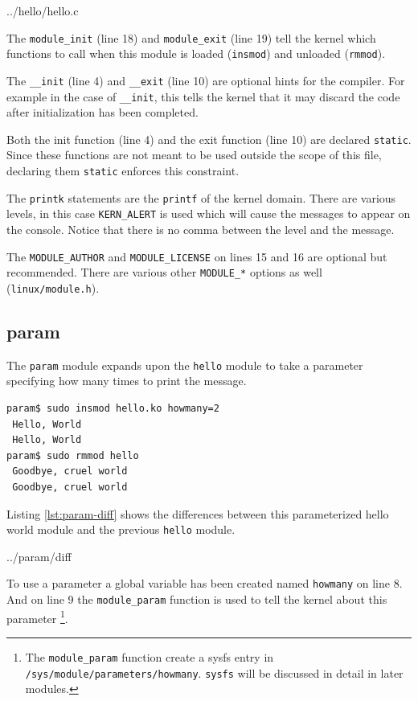 \documentclass{article}
\begin{document}

	{../hello/hello.c}

The \verb+module_init+ (line 18) and \verb+module_exit+ (line 19) tell
the kernel which functions to call when this module is
loaded (\verb+insmod+) and unloaded (\verb+rmmod+).

The \verb+__init+ (line 4) and \verb+__exit+ (line 10)
are optional hints for the compiler.  For example in the case of
\verb+__init+, this tells the kernel that it may discard the code
after initialization has been completed.

Both the init function (line 4) and the exit function (line 10)
are declared \verb+static+.
Since these functions are not meant to be used outside the scope
of this file, declaring them \verb+static+ enforces this
constraint\autocite[Pg. 52]{corbet2009linux}.

The \verb+printk+ statements are the \verb+printf+ of the
kernel domain.  There are various levels, in this case
\verb+KERN_ALERT+ is used which will cause the messages
to appear on the console.  Notice that there is no comma
between the level and the message.

The \verb+MODULE_AUTHOR+ and \verb+MODULE_LICENSE+ on lines 15 and 16
are optional but recommended\autocite[Pg. 51]{corbet2009linux}.
There are various other \verb+MODULE_*+
options as well (\verb+linux/module.h+).

\subsection{param}

The \verb+param+ module expands upon the \verb+hello+ module to
take a parameter specifying how many times to print the message.

\begin{verbatim}
param$ sudo insmod hello.ko howmany=2
 Hello, World
 Hello, World
param$ sudo rmmod hello
 Goodbye, cruel world
 Goodbye, cruel world
\end{verbatim}

Listing \ref{lst:param-diff} shows the differences between this
parameterized hello world module and the previous \verb+hello+ module.


	{../param/diff}

To use a parameter a global variable has been created named \verb+howmany+
on line 8.
And on line 9 the \verb+module_param+ function is used to tell
the kernel about this parameter
\footnote{The \verb+module_param+ function create a sysfs entry
in \verb+/sys/module/parameters/howmany+.  \verb+sysfs+ will
be discussed in detail in later modules.}.
\end{document}
